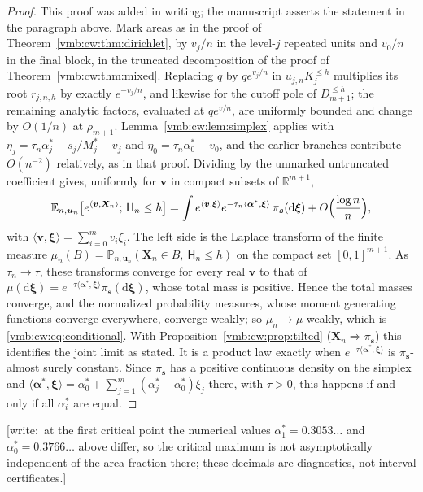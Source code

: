 \documentclass[11pt,a4paper]{article}
\numberwithin{equation}{section}
\theoremstyle{definition}\newtheorem{definition}[theorem]{Definition}
\theoremstyle{remark}\newtheorem{remark}[theorem]{Remark}
\newcommand{\E}{\mathbb E}
\newcommand{\Prob}{\mathbb P}
\newcommand{\dd}{\mathrm d}
\newcommand{\wrt}[1]{\textup{[}\textsf{write:}~#1\textup{]}}
\begin{document}
\begin{proof}
This proof was added in writing; the manuscript asserts the statement in
the paragraph above. Mark areas as in the proof of
Theorem~\ref{vmb:cw:thm:dirichlet}, by $v_j/n$ in the level-$j$ repeated units
and $v_0/n$ in the final block, in the truncated decomposition of the proof
of Theorem~\ref{vmb:cw:thm:mixed}. Replacing $q$ by $qe^{v_j/n}$ in
$u_{j,n}K_j^{\le h}$ multiplies its root $r_{j,n,h}$ by exactly
$e^{-v_j/n}$, and likewise for the cutoff pole of $D_{m+1}^{\le h}$; the
remaining analytic factors, evaluated at $qe^{v/n}$, are uniformly bounded
and change by $O(1/n)$ at $\rho_{m+1}$. Lemma~\ref{vmb:cw:lem:simplex} applies with
$\eta_j=\tau_n\alpha_j^*-s_j/M_j^*-v_j$ and $\eta_0=\tau_n\alpha_0^*-v_0$, and
the earlier branches contribute $O(n^{-2})$ relatively, as in that proof.
Dividing by the unmarked untruncated coefficient gives, uniformly for
$\bm v$ in compact subsets of $\mathbb R^{m+1}$,
\[
 \E_{n,\bm u_n}\bigl[e^{\langle\bm v,\bm X_n\rangle};\,\mathsf H_n\le h\bigr]
 =\int e^{\langle\bm v,\bm\xi\rangle}
 e^{-\tau_n\langle\bm\alpha^*,\bm\xi\rangle}\,\pi_{\bm s}(\dd\bm\xi)
 +O\Bigl(\frac{\log n}n\Bigr),
\]
with $\langle\bm v,\bm\xi\rangle=\sum_{i=0}^mv_i\xi_i$. The left side is the
Laplace transform of the finite measure
$\mu_n(B)=\Prob_{n,\bm u_n}(\bm X_n\in B,\ \mathsf H_n\le h)$ on the compact
set $[0,1]^{m+1}$. As $\tau_n\to\tau$, these transforms converge for every
real $\bm v$ to that of
$\mu(\dd\bm\xi)=e^{-\tau\langle\bm\alpha^*,\bm\xi\rangle}\pi_{\bm s}(\dd\bm\xi)$,
whose total mass is positive. Hence the total masses converge, and the
normalized probability measures, whose moment generating functions converge
everywhere, converge weakly; so $\mu_n\to\mu$ weakly, which is
\eqref{vmb:cw:eq:conditional}. With Proposition~\ref{vmb:cw:prop:tilted}
($\bm X_n\Rightarrow\pi_{\bm s}$) this identifies the joint limit as stated.
It is a product law exactly when $e^{-\tau\langle\bm\alpha^*,\bm\xi\rangle}$
is $\pi_{\bm s}$-almost surely constant. Since $\pi_{\bm s}$ has a positive
continuous density on the simplex and
$\langle\bm\alpha^*,\bm\xi\rangle=\alpha_0^*+\sum_{j=1}^m(\alpha_j^*-\alpha_0^*)\xi_j$
there, with $\tau>0$, this happens if and only if all $\alpha_i^*$ are equal.
\end{proof}

\wrt{at the first critical point the numerical values
$\alpha_1^*=0.3053\ldots$ and $\alpha_0^*=0.3766\ldots$ above differ, so the
critical maximum is not asymptotically independent of the area fraction
there; these decimals are diagnostics, not interval certificates.}
\end{document}
